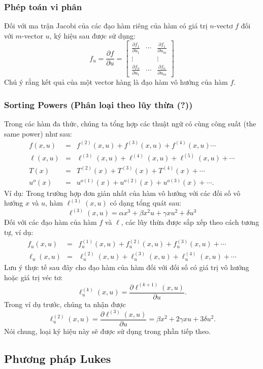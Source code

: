 \documentclass[12pt,a4paper]{report}
\begin{document}
\subsubsection{Phép toán vi phân} Đối với ma trận Jacobi của các đạo hàm riêng của hàm có giá trị $n$-vectơ $f$ đối với $m$-vector $u$, ký hiệu sau được sử dụng: $$f_u = \frac{\partial f}{\partial u} = \begin{bmatrix}
\frac{\partial f_1}{\partial u_1} & \cdots & \frac{\partial f_1}{\partial u_m}\\ \vdots && \vdots \\ \frac{\partial f_n}{\partial u_1} &\cdots& \frac{\partial f_n}{\partial u_m}
\end{bmatrix}$$
Chú ý rằng kết quả của một vector hàng là đạo hàm vô hướng của hàm $f$.
\subsubsection{Sorting Powers (Phân loại theo lũy thừa (?))} Trong các hàm đa thức, chúng ta tổng hợp các thuật ngữ có cùng công suất (the same power) như sau: \begin{eqnarray}
	f(x, u) &=& f^{(2)}(x, u) + f^{(3)}(x, u) + f^{(4)}(x, u)\cdots \nonumber \\
	\ell(x, u) &=& \ell^{(3)}(x, u) + \ell^{(4)}(x, u) + \ell^{(5)}(x, u) + \cdots \nonumber \\
	T(x) &=& T^{(2)}(x) + T^{(3)}(x) + T^{(4)}(x) + \cdots \nonumber \\ u^o(x) &=& u^{o(1)}(x) + u^{o(2)}(x) + u^{o(3)}(x) + \cdots \nonumber .
\end{eqnarray}
Ví dụ: Trong trường hợp đơn giản nhất của hàm vô hướng với các đối số vô hướng $x$ và $u$, hàm $\ell^{(3)}(x, u)$ có dạng tổng quát sau: $$\ell^{(3)}(x, u) = \alpha x^3 + \beta x^2u + \gamma xu^2 + \delta u^3$$
Đối với các đạo hàm của hàm $f$ và $\ell$, các lũy thừa được sắp xếp theo cách tương tự, ví dụ: \begin{eqnarray}
	f_u(x, u) &=& f_u^{(1)}(x, u) + f_u^{(2)}(x, u) + f_u^{(3)}(x, u) + \cdots \nonumber \\ \ell_u(x, u) &=& \ell_u^{(2)}(x, u) + \ell_u^{(3)}(x, u) + \ell_u^{(4)}(x, u) + \cdots \nonumber
\end{eqnarray}
Lưu ý thực tế sau đây cho đạo hàm của hàm đối với đối số có giá trị vô hướng hoặc giá trị véc tơ: $$\ell_u^{(k)}(x, u) = \frac{\partial\ell^{(k+1)}(x, u)}{\partial u}.$$
Trong ví dụ trước, chúng ta nhận được
$$\ell_u^{(2)}(x, u) = \frac{\partial\ell^{(3)}(x, u)}{\partial u} = \beta x^2 + 2\gamma xu + 3\delta u^2.$$
Nói chung, loại ký hiệu này sẽ được sử dụng trong phần tiếp theo. 
\subsection{Phương pháp Lukes}
\end{document}
